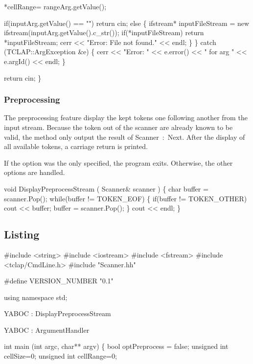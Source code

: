                 *cellRange= rangeArg.getValue();

                if(inputArg.getValue() == "") return cin;
                else \{
                        ifstream* inputFileStream = new ifstream(inputArg.getValue().c_str());
                        if(*inputFileStream) return *inputFileStream;
                        cerr << "Error: File not found." << endl;
                \}
        \} catch (TCLAP::ArgException &e) \{
                cerr << "Error: " << e.error() << " for arg " << e.argId() << endl; 
        \}

        return cin;
\}
\nwendcode{}\nwdocspar

\subsubsection{Preprocessing}
The preprocessing feature display the kept tokens one following another from 
the input stream. Because the token out of the scanner are already known to be
valid, the method only output the result of {\Tt{}Scanner\ :\ Next\nwendquote}. After the 
display of all available tokens, a carriage return is printed.

\newpar If the option was the only specified, the program exits. Otherwise, the 
other options are handled.

\nwenddocs{}\endmoddef\nwstartdeflinemarkup\nwenddeflinemarkup
void DisplayPreprocessStream ( Scanner& scanner ) \{
        char buffer = scanner.Pop();
        while(buffer != TOKEN_EOF) \{
                if(buffer != TOKEN_OTHER) cout << buffer;
                buffer = scanner.Pop();
        \}
        cout << endl;
\}
\nwendcode{}\nwdocspar

\subsection{Listing}
\nwenddocs{}\endmoddef\nwstartdeflinemarkup\nwenddeflinemarkup
#include <string>
#include <iostream>
#include <fstream>
#include <tclap/CmdLine.h>
#include "Scanner.hh"

#define VERSION_NUMBER "0.1" 

using namespace std;

\LA{}YABOC : DisplayPreprocessStream\RA{}

\LA{}YABOC : ArgumentHandler\RA{}

int main (int argc, char** argv) \{
        bool optPreprocess = false;
  unsigned int cellSize=0;
  unsigned int cellRange=0;

